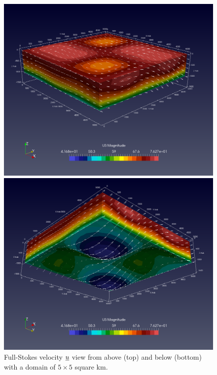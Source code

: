 \begin{figure}
  \centering

    \includegraphics[width=0.7\linewidth]{images/momentum/ISMIP_HOM_A/paraview/FS_top.png}

    \vspace{10mm}

    \includegraphics[width=0.7\linewidth]{images/momentum/ISMIP_HOM_A/paraview/FS_bottom.png}

    \caption[Three-dimensional ISMIP-HOM momentum solution]{Full-Stokes velocity $\underline{u}$ view from above (top) and below (bottom) with a domain of $5 \times 5$ square km.}

  \label{ismip_hom_a_paraview}
\end{figure}

